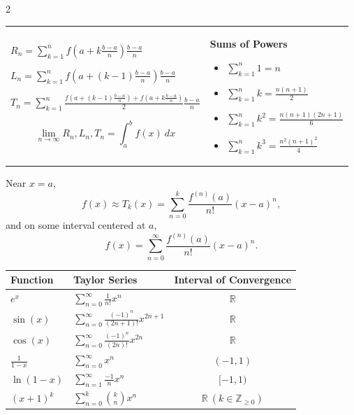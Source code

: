 \documentclass{article}
\newenvironment{bx}[1][]{
\begin{tcolorbox}[colback=white!97!black, title=#1, arc=0in, halign=flush left, left=1mm, right=1mm,]
}{
\end{tcolorbox}
}
\begin{document}
\begin{multicols}{2}

\begin{bx}[Riemann Sums]
\vspace{-0.5em}

\begin{tabular}{p{155pt}  p{100pt}}
    $ R_n=\sum_{k=1}^{n}f\left(a+k\frac{b-a}{n}\right)\frac{b-a}{n}$ 

$ L_n=\sum_{k=1}^{n}f\left(a+(k-1)\frac{b-a}{n}\right)\frac{b-a}{n}$ 

$ T_n=\sum_{k=1}^{n}\frac{f\left(a+(k-1)\frac{b-a}{n}\right)+f\left(a+k\frac{b-a}{n}\right)}{2}\frac{b-a}{n}$

\vspace{-1em}

$$\lim_{n\to\infty}R_n,L_n,T_n=\int_a^bf(x)\ dx$$

& 

\textbf{Sums of Powers}

\begin{itemize}[leftmargin=0.75em]
    \item $\sum_{k=1}^n 1 = n $
    \item $\sum_{k=1}^n k = \frac{n(n+1)}{2}$
    \item $\sum_{k=1}^n k^2 = \frac{n(n+1)(2n+1)}{6}$
    \item $\sum_{k=1}^n k^3 = \frac{n^2(n+1)^2}{4}$
\end{itemize}
\end{tabular}

\vspace{-1em}

\end{bx}





\begin{bx}[Power Series]
 Near $x=a$, 
$$f(x)\approx T_k(x)=\sum_{n=0}^k \frac{f^{(n)}(a)}{n!}(x-a)^n,$$
and on some interval centered at $a$,
$$f(x)=\sum_{n=0}^\infty \frac{f^{(n)}(a)}{n!}(x-a)^n.$$

\begin{center}
\def\arraystretch{1.55}
\begin{tabular}{llc}
\midrule[0.4mm]
Function & Taylor Series & Interval of Convergence\\
\midrule
$e^x$ & $\sum_{n=0}^\infty\frac{1}{n!} x^n$ & $\mathbb{R}$ \\
$\sin(x)$ & $\sum_{n=0}^\infty\frac{(-1)^n}{(2n+1)!}x^{2n+1}$ & $\mathbb{R}$ \\
$\cos(x)$ & $\sum_{n=0}^\infty\frac{(-1)^n}{(2n)!}x^{2n}$ & $\mathbb{R}$ \\
$\frac{1}{1-x}$ & $\sum_{n=0}^\infty x^n$ & $(-1,1)$ \\
$\ln(1-x)$ & $\sum_{n=1}^\infty \frac{-1}{n}x^{n}$ & $[-1,1)$ \\
$(x+1)^k$ & $\sum_{n=0}^{k}{k\choose n}x^{n}$ & $\mathbb{R}\ (k\in\mathbb{Z}_{\geq 0})$ \\
\bottomrule[0.4mm]
\end{tabular}
\end{center}



\end{bx}
\end{multicols}
\end{document}
